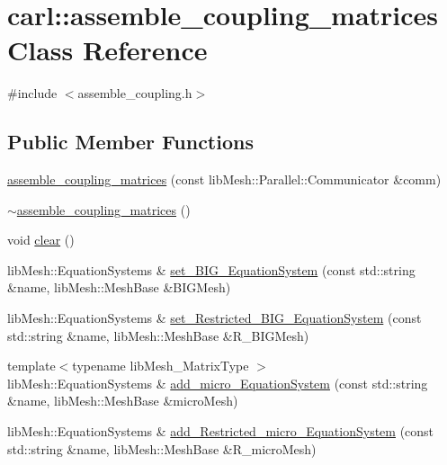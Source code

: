 \hypertarget{classcarl_1_1assemble__coupling__matrices}{}\section{carl\+:\+:assemble\+\_\+coupling\+\_\+matrices Class Reference}
\label{classcarl_1_1assemble__coupling__matrices}


{\ttfamily \#include $<$assemble\+\_\+coupling.\+h$>$}

\subsection*{Public Member Functions}
\begin{DoxyCompactItemize}
\item 
\hyperlink{classcarl_1_1assemble__coupling__matrices_a241a34bd5cc9b968f1d3d5d1ed7b5b0c}{assemble\+\_\+coupling\+\_\+matrices} (const lib\+Mesh\+::\+Parallel\+::\+Communicator \&comm)
\item 
\hyperlink{classcarl_1_1assemble__coupling__matrices_a0a9d43d2af319a9065e720d73b87190f}{$\sim$assemble\+\_\+coupling\+\_\+matrices} ()
\item 
void \hyperlink{classcarl_1_1assemble__coupling__matrices_a3b3020dd40cd78050744b35f9515b4d8}{clear} ()
\item 
lib\+Mesh\+::\+Equation\+Systems \& \hyperlink{classcarl_1_1assemble__coupling__matrices_a4ae5318b482918a2894a7fbcfde71b47}{set\+\_\+\+B\+I\+G\+\_\+\+Equation\+System} (const std\+::string \&name, lib\+Mesh\+::\+Mesh\+Base \&B\+I\+G\+Mesh)
\item 
lib\+Mesh\+::\+Equation\+Systems \& \hyperlink{classcarl_1_1assemble__coupling__matrices_a612773fda111eb80066b78cba261487e}{set\+\_\+\+Restricted\+\_\+\+B\+I\+G\+\_\+\+Equation\+System} (const std\+::string \&name, lib\+Mesh\+::\+Mesh\+Base \&R\+\_\+\+B\+I\+G\+Mesh)
\item 
{\footnotesize template$<$typename lib\+Mesh\+\_\+\+Matrix\+Type $>$ }\\lib\+Mesh\+::\+Equation\+Systems \& \hyperlink{classcarl_1_1assemble__coupling__matrices_a9ce9e893a73b9daaa7e7a419981495cc}{add\+\_\+micro\+\_\+\+Equation\+System} (const std\+::string \&name, lib\+Mesh\+::\+Mesh\+Base \&micro\+Mesh)
\item 
lib\+Mesh\+::\+Equation\+Systems \& \hyperlink{classcarl_1_1assemble__coupling__matrices_a94097d94bf9d2cb279fa062acaa1cb11}{add\+\_\+\+Restricted\+\_\+micro\+\_\+\+Equation\+System} (const std\+::string \&name, lib\+Mesh\+::\+Mesh\+Base \&R\+\_\+micro\+Mesh)

\end{DoxyCompactItemize}
